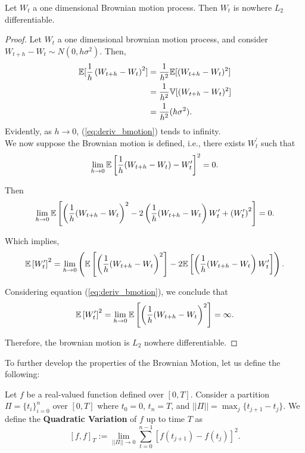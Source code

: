 \documentclass[../TGMAFFIRO]{subfiles}
\begin{document}
\begin{proposition}
	Let $W_t$ a one dimensional Brownian motion process. Then $W_t$ is nowhere $L_2$ differentiable.
\end{proposition}
\begin{proof}
Let $W_t$ a one dimensional brownian motion process, and consider $W_{t+h} - W_t \sim N(0, h\sigma^2)$. Then,
\begin{align}
	\mathbb{E}[\frac{1}{h}\left(W_{t+h} - W_t\right)^2] &= \frac{1}{h^2}\mathbb{E}[(W_{t+h} - W_t)^2] \nonumber\\
												&= \frac{1}{h^2}\mathbb{V}[(W_{t+h} - W_t)^2] \nonumber\\
												&= \frac{1}{h^2}(h\sigma^2).\label{eq:deriv_bmotion}
\end{align}
Evidently, as $h\to 0$, (\ref{eq:deriv_bmotion}) tends to infinity.\\

We now suppose the Brownian motion is defined, i.e., there exists $W_t^\prime$ such that
\begin{equation}
  \lim_{h\to 0}\mathbb{E}\left[\frac{1}{h}(W_{t+h} - W_t) - W_t^\prime\right]^2 = 0.
\end{equation}

Then
\begin{equation}
  \lim_{h\to 0}\mathbb{E}\left[\left(\frac{1}{h}(W_{t+h} - W_t\right)^2 -
  					   2\left(\frac{1}{h}(W_{t+h} - W_t\right)W_t^\prime + 
  					   \left(W_t^\prime\right)^2\right] = 0.
\end{equation}

Which implies,
\begin{equation*}
	\mathbb{E}\left[W_t^\prime\right]^2 =  \lim_{h\to 0}\left(\mathbb{E}\left[\left(\frac{1}{h}(W_{t+h} - W_t\right)^2\right] -
  					   2\mathbb{E}\left[\left(\frac{1}{h}(W_{t+h} - W_t\right)W_t^\prime\right]\right).
\end{equation*}

Considering equation (\ref{eq:deriv_bmotion}), we conclude that
\begin{equation*}
	\mathbb{E}\left[W_t^\prime\right]^2 =  \lim_{h\to 0}\mathbb{E}\left[\left(\frac{1}{h}(W_{t+h} - W_t\right)^2\right] = \infty.
\end{equation*}

Therefore, the brownian motion is $L_2$ nowhere differentiable.
\end{proof}

To further develop the properties of the Brownian Motion, let us define the following:
\begin{definition}\label{def:quadratic_variation}
	Let $f$ be a real-valued function defined over $[0, T]$. Consider a partition $\Pi= \{t_i\}_{i=0}^{n}$ over $[0, T]$ where $t_0 = 0$, $t_n = T$, and $||\Pi|| = \max_j\{t_{j+1} - t_j\}$. We define the \textbf{Quadratic Variation} of $f$ up to time $T$ as
	\[
		[f, f]_T := \lim_{||\Pi|| \to 0} \sum_{t=0}^{n-1}\left[f(t_{j+1}) - f(t_{j})\right]^2.
	\]
\end{definition}
\end{document}
